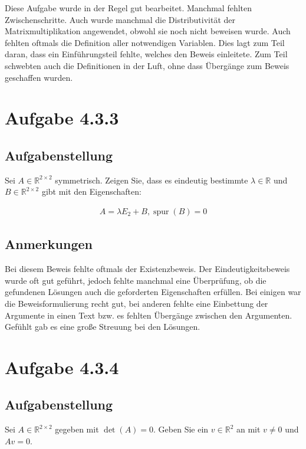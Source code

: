 \documentclass[a4paper]{article}
\newcommand*{\R}{\mathbb R}
\begin{document}
Diese Aufgabe wurde in der Regel gut bearbeitet. Manchmal fehlten Zwischenschritte. Auch wurde manchmal die Distributivität der Matrixmultiplikation angewendet, obwohl sie noch nicht beweisen wurde. Auch fehlten oftmals die Definition aller notwendigen Variablen. Dies lagt zum Teil daran, dass ein Einführungsteil fehlte, welches den Beweis einleitete. Zum Teil schwebten auch die Definitionen in der Luft, ohne dass Übergänge zum Beweis geschaffen wurden.

\section{Aufgabe 4.3.3}

\subsection{Aufgabenstellung}

Sei $A\in\R^{2\times 2}$ symmetrisch. Zeigen Sie, dass es eindeutig bestimmte $\lambda\in\R$ und $B\in\R^{2\times 2}$ gibt mit den Eigenschaften:

\begin{align}
  A = \lambda E_2 + B, \operatorname{spur}(B) = 0
\end{align}

\subsection{Anmerkungen}

Bei diesem Beweis fehlte oftmals der Existenzbeweis. Der Eindeutigkeitsbeweis wurde oft gut geführt, jedoch fehlte manchmal eine Überprüfung, ob die gefundenen Lösungen auch die geforderten Eigenschaften erfüllen. Bei einigen war die Beweisformulierung recht gut, bei anderen fehlte eine Einbettung der Argumente in einen Text bzw. es fehlten Übergänge zwischen den Argumenten. Gefühlt gab es eine große Streuung bei den Lösungen.

\section{Aufgabe 4.3.4}

\subsection{Aufgabenstellung}

Sei $A\in\R^{2\times 2}$ gegeben mit $\det(A)=0$. Geben Sie ein $v\in\R^2$ an mit $v\neq 0$ und $Av=0$.
\end{document}
